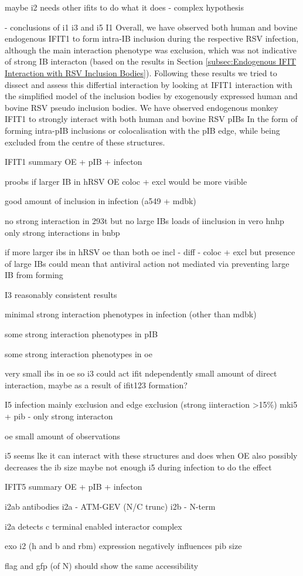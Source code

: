 maybe i2 needs other ifits to do what it does - complex hypothesis





- conclusions of i1 i3 and i5
I1
Overall, we have observed both human and bovine endogenous IFIT1 to form intra-IB inclusion during the respective RSV infection, although the main interaction phenotype was exclusion, which was not indicative of strong IB interacton (based on the results in Section \ref{subsec:Endogenous IFIT Interaction with RSV Inclusion Bodies}). Following these results we tried to dissect and assess this differtial interaction by looking at IFIT1 interaction with the simplified model of the inclusion bodies by exogenously expressed human and bovine RSV pseudo inclusion bodies. We have observed endogenous monkey IFIT1 to strongly interact with both human and bovine RSV pIBs In the form of forming intra-pIB inclusions or colocalisation with the pIB edge, while being excluded from the centre of these structures. 


IFIT1 summary OE + pIB + infecton

proobs if larger IB in hRSV OE coloc + excl would be more visible


good amount of inclusion in infection (a549 + mdbk)

no strong interaction in 293t but no large IBs
loads of iinclusion in vero hnhp
only strong interactions in bnbp

if more larger ibs in hRSV oe than both oe incl -  diff - coloc + excl
but presence of large IBs could mean that antiviral action not mediated via preventing large IB from forming

I3
reasonably consistent results

minimal strong interaction phenotypes in infection (other than mdbk)

some strong interaction phenotypes in pIB

some strong interaction phenotypes in oe


very small ibs in oe so i3 could act ifit ndependently
small amount of direct interaction, maybe as a result of ifit123 formation?

I5
infection mainly exclusion and edge exclusion (strong iinteraction >15\%)
mki5 + pib - only strong interacton

oe small amount of observations

i5 seems lke it can interact with these structures and does when OE
also possibly decreases the ib size
maybe not enough i5 during infection to do the effect

IFIT5 summary OE + pIB + infecton





i2ab antibodies
i2a - ATM-GEV (N/C trunc)
i2b - N-term

i2a detects c terminal enabled interactor complex


exo i2 (h and b and rbm) expression negatively influences pib size


flag and gfp (of N) should show the same accessibility

